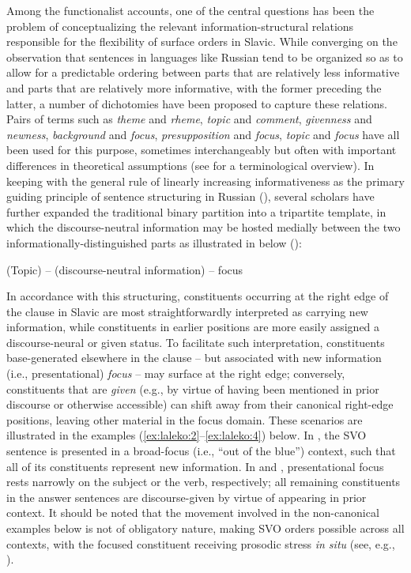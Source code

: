 \documentclass[output=paper]{langscibook}
\begin{document}
Among the functionalist accounts, one of the central questions has been the problem of conceptualizing the relevant information-structural relations responsible for the flexibility of surface orders in Slavic. While converging on the observation that sentences in languages like Russian tend to be organized so as to allow for a predictable ordering between parts that are relatively less informative and parts that are relatively more informative, with the former preceding the latter, a number of dichotomies have been proposed to capture these relations. Pairs of terms such as \textit{theme} and \textit{rheme}, \textit{topic} and \textit{comment}, \textit{givenness} and \textit{newness}, \textit{background} and \textit{focus}, \textit{presupposition} and \textit{focus}, \textit{topic} and \textit{focus} have all been used for this purpose, sometimes interchangeably but often with important differences in theoretical assumptions (see \citealt{GundelFretheim2004} for a terminological overview). In keeping with the general rule of linearly increasing informativeness as the primary guiding principle of sentence structuring in Russian (\citealt{Gundel1988}), several scholars have further expanded the traditional binary partition into a tripartite template, in which the discourse-neutral information may be hosted medially between the two informationally-distinguished parts as illustrated in  below (\citealt{Brun2001, King1995}):

\ea%
    \label{ex:laleko:1}
           (Topic) – (discourse-neutral information) – focus
\z


\begin{sloppypar}
In accordance with this structuring, constituents occurring at the right edge of the clause in Slavic are most straightforwardly interpreted as carrying new information, while constituents in earlier positions are more easily assigned a discourse-neural or given status. To facilitate such interpretation, constituents base-generated elsewhere in the clause – but associated with new information (i.e., presentational) \textit{focus} – may surface at the right edge; conversely, constituents that are \textit{given} (e.g., by virtue of having been mentioned in prior discourse or otherwise accessible) can shift away from their canonical right-edge positions, leaving other material in the focus domain. These scenarios are illustrated in the examples (\ref{ex:laleko:2}--\ref{ex:laleko:4}) below. In , the SVO sentence is presented in a broad-focus (i.e., “out of the blue”) context, such that all of its constituents represent new information. In  and , presentational focus rests narrowly on the subject or the verb, respectively; all remaining constituents in the answer sentences are discourse-given by virtue of appearing in prior context. It should be noted that the movement involved in the non-canonical examples below is not of obligatory nature, making SVO orders possible across all contexts, with the focused constituent receiving prosodic stress \textit{in situ} (see, e.g., \citealt{Jasinskaja2016}).
\end{sloppypar}
\end{document}
